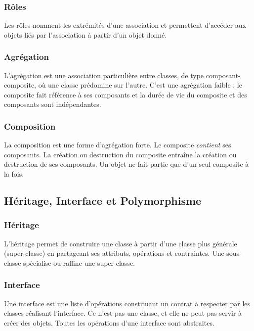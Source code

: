 \documentclass{article}
\begin{document}
\begin{itemize}
\subsubsection{Rôles}

Les rôles nomment les extrémités d'une association et permettent d'accéder aux objets liés par l'association à partir d'un objet donné.

\subsubsection{Agrégation}

L'agrégation est une association particulière entre classes, de type composant-composite, où une classe prédomine sur l'autre.  C'est une agrégation faible : le composite fait référence à ses composants et la durée de vie du composite et des composants sont indépendantes.

\subsubsection{Composition}

La composition est une forme d'agrégation forte. Le composite \textit{contient} ses composants.  La création ou destruction du composite entraîne la création ou destruction de ses composants. Un objet ne fait partie que d'un seul composite à la fois.

\subsection{Héritage, Interface et Polymorphisme}

\subsubsection{Héritage}

L'héritage permet de construire une classe à partir d'une classe plus générale (super-classe) en partageant ses attributs, opérations et contraintes.  Une sous-classe spécialise ou raffine une super-classe.

\subsubsection{Interface}

Une interface est une liste d'opérations constituant un contrat à respecter par les classes réalisant l'interface.  Ce n'est pas une classe, et elle ne peut pas servir à créer des objets. Toutes les opérations d'une interface sont abstraites.


\end{itemize}
\end{document}
